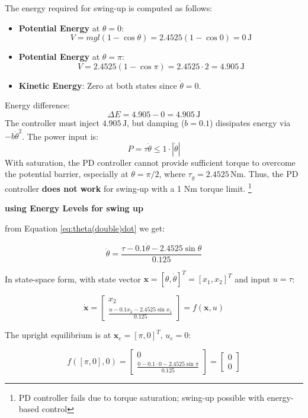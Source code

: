 \documentclass[12pt,a4paper]{article}
\begin{document}
The energy required for swing-up is computed as follows:
\begin{itemize}
    \item \textbf{Potential Energy} at \(\theta = 0\):
    \[
    V = m g l (1 - \cos \theta) = 2.4525 (1 - \cos 0) = 0 \, \text{J}
    \]
    \item \textbf{Potential Energy} at \(\theta = \pi\):
    \[
    V = 2.4525 (1 - \cos \pi) = 2.4525 \cdot 2 = 4.905 \, \text{J}
    \]
    \item \textbf{Kinetic Energy}: Zero at both states since \(\dot{\theta} = 0\).
\end{itemize}
Energy difference:
\[
\Delta E = 4.905 - 0 = 4.905 \, \text{J}
\]
The controller must inject \(4.905 \, \text{J}\), but damping (\(b = 0.1\)) dissipates energy via \(-b \dot{\theta}^2\). The power input is:
\[
P = \tau \dot{\theta} \leq 1 \cdot |\dot{\theta}|
\]
With saturation, the PD controller cannot provide sufficient torque to overcome the potential barrier, especially at \(\theta = \pi/2\), where \(\tau_g = 2.4525 \, \text{Nm}\). Thus, the PD controller \textbf{does not work} for swing-up with a 1 Nm torque limit. \footnote{PD controller fails due to torque saturation; swing-up possible with energy-based control}

\textbf{using Energy Levels for swing up}


from Equation \eqref{eq:theta(double)dot}
we get:

\begin{equation}\label{eq:theta(double)dot}
\ddot{\theta} = \frac{\tau - 0.1 \dot{\theta} - 2.4525 \sin \theta}{0.125}
\end{equation}

In state-space form, with state vector \( \mathbf{x} = [\theta, \dot{\theta}]^T = [x_1, x_2]^T \) and input \( u = \tau \):

\begin{equation}
\dot{\mathbf{x}} = \begin{bmatrix} x_2 \\ \frac{u - 0.1 x_2 - 2.4525 \sin x_1}{0.125} \end{bmatrix} = f(\mathbf{x}, u)
\end{equation}

The upright equilibrium is at \( \mathbf{x}_e = [\pi, 0]^T \), \( u_e = 0 \):

\begin{equation}
f([\pi, 0], 0) = \begin{bmatrix} 0 \\ \frac{0 - 0.1 \cdot 0 - 2.4525 \sin \pi}{0.125} \end{bmatrix} = \begin{bmatrix} 0 \\ 0 \end{bmatrix}
\end{equation}
\end{document}
